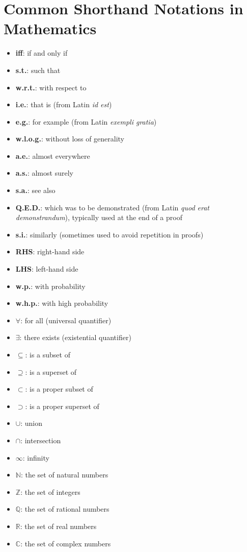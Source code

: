\documentclass{article}
\begin{document}
\section*{Common Shorthand Notations in Mathematics}

\begin{itemize}
    \item \textbf{iff}: if and only if
    \item \textbf{s.t.}: such that
    \item \textbf{w.r.t.}: with respect to
    \item \textbf{i.e.}: that is (from Latin \textit{id est})
    \item \textbf{e.g.}: for example (from Latin \textit{exempli gratia})
    \item \textbf{w.l.o.g.}: without loss of generality
    \item \textbf{a.e.}: almost everywhere
    \item \textbf{a.s.}: almost surely
    \item \textbf{s.a.}: see also
    \item \textbf{Q.E.D.}: which was to be demonstrated (from Latin \textit{quod erat demonstrandum}), typically used at the end of a proof
    \item \textbf{s.i.}: similarly (sometimes used to avoid repetition in proofs)
    \item \textbf{RHS}: right-hand side
    \item \textbf{LHS}: left-hand side
    \item \textbf{w.p.}: with probability
    \item \textbf{w.h.p.}: with high probability
    \item \textbf{$\forall$}: for all (universal quantifier)
    \item \textbf{$\exists$}: there exists (existential quantifier)
    \item \textbf{$\subseteq$}: is a subset of
    \item \textbf{$\supseteq$}: is a superset of
    \item \textbf{$\subset$}: is a proper subset of
    \item \textbf{$\supset$}: is a proper superset of
    \item \textbf{$\cup$}: union
    \item \textbf{$\cap$}: intersection
    \item \textbf{$\infty$}: infinity
    \item \textbf{$\mathbb{N}$}: the set of natural numbers
    \item \textbf{$\mathbb{Z}$}: the set of integers
    \item \textbf{$\mathbb{Q}$}: the set of rational numbers
    \item \textbf{$\mathbb{R}$}: the set of real numbers
    \item \textbf{$\mathbb{C}$}: the set of complex numbers
\end{itemize}
\end{document}
